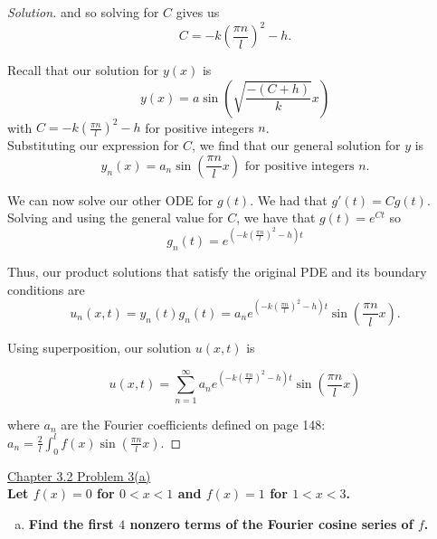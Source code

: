 \documentclass[11pt]{article}
\newenvironment{solution}
  {\renewcommand\qedsymbol{$\blacksquare$}\begin{proof}[Solution]}
  {\end{proof}}
\begin{document}
\begin{solution}
and so solving for $C$ gives us \[C = -k\left( \frac{\pi n}{l} \right)^2 - h.\]

Recall that our solution for $y(x)$ is \[y(x) =  a\sin\left(\sqrt{\frac{-(C+h)}{k}}x\right)\]
with $C = -k\left( \frac{\pi n}{l} \right)^2 - h$ for positive integers $n$. \\

Substituting our expression for $C$, we find that our general solution for $y$ is 
\[ y_n(x) = a_n \sin\left(\frac{\pi n}{l}x\right) \text { for positive integers } n.\]

We can now solve our other ODE for $g(t)$. We had that $g'(t) = Cg(t)$. Solving and using the general value for $C$, we have that $g(t) = e^{Ct}$ so 
\[ g_n(t) = e^{\left(-k\left( \frac{\pi n}{l} \right)^2 - h\right)t}\]

Thus, our product solutions that satisfy the original PDE and its boundary conditions are 
\[ u_n(x, t) = y_n(t) g_n(t) = a_ne^{\left(-k\left( \frac{\pi n}{l} \right)^2 - h\right)t} \sin\left(\frac{\pi n}{l} x\right). \]

Using superposition, our solution $u(x, t)$ is 

\[ \boxed{u(x, t) = \sum\limits_{n=1}^{\infty} a_ne^{\left(-k\left( \frac{\pi n}{l} \right)^2 - h\right)t} \sin\left(\frac{\pi n}{l} x\right)}\]

where $a_n$ are the Fourier coefficients defined on page 148: $a_n = \frac{2}{l}\int_0^l f(x) \sin\left(\frac{\pi n}{l} x \right).$

\end{solution}
\newpage

\underline{Chapter 3.2 Problem 3(a)} \\

\textbf{Let $f(x)=0$ for $0<x<1$ and $f(x)=1$ for $1<x<3$.}
\begin{enumerate}[a)] 
    \item \textbf{Find the first $4$ nonzero terms of the Fourier cosine series of $f$.}
  
\end{enumerate}
\end{document}
